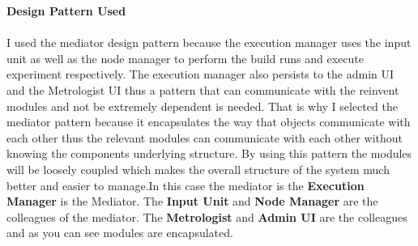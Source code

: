     \par {\textbf{Design Pattern Used} \\ \\
	I used the mediator design pattern because the execution manager uses the input unit as well as the node manager to perform the build runs and execute experiment respectively. The execution manager also persists to the admin UI and the Metrologist UI thus a pattern that can communicate with the reinvent modules and not be extremely dependent is needed. That is why I selected the mediator pattern because it encapsulates the way that objects communicate with each other thus the relevant modules can communicate with each other without knowing the components underlying structure. By using this pattern the modules will be loosely coupled which makes the overall structure of the system much better and easier to manage.In this case the mediator is the \textbf{Execution Manager}  is the Mediator. The \textbf{Input Unit} and \textbf{Node Manager } are the colleagues of the mediator. The \textbf{Metrologist} and \textbf{Admin UI} are the colleagues and as you can see modules are encapsulated.}
		
